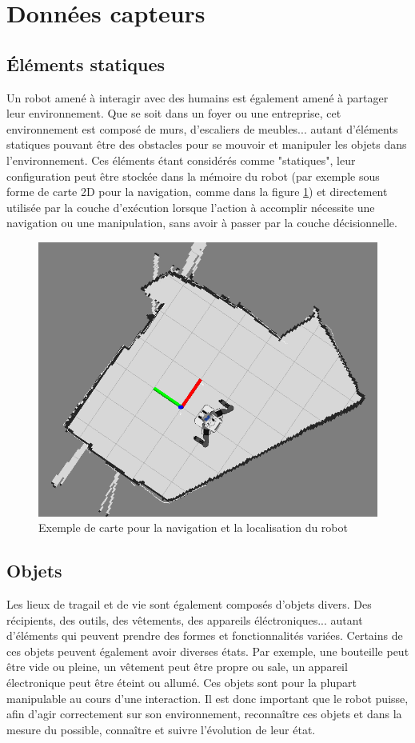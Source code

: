\documentclass[a4paper,11pt,twoside]{StyleThese}
\begin{document}
\section{Données capteurs}
\label{sec:collecte}
\subsection{Éléments statiques}
Un robot amené à interagir avec des humains est également amené à partager leur environnement. Que se soit dans un foyer ou une entreprise, cet environnement est composé de murs, d'escaliers de meubles... autant d'éléments statiques pouvant être des obstacles pour se mouvoir et manipuler les objets dans l'environnement. Ces éléments étant considérés comme "statiques", leur configuration peut être stockée dans la mémoire du robot (par exemple sous forme de carte 2D pour la navigation, comme dans la figure \ref{fig:map}) et directement utilisée par la couche d'exécution lorsque l'action à accomplir nécessite une navigation ou une manipulation, sans avoir à passer par la couche décisionnelle.

\begin{figure}[ht!]
 \centering
  \includegraphics[width=0.59\linewidth]{./img/Map2d.png} 
  \caption {Exemple de carte pour la navigation et la localisation du robot}
  \label{fig:map}
\end{figure}

\subsection{Objets}
Les lieux de tragail et de vie sont également composés d'objets divers. Des récipients, des outils, des vêtements, des appareils éléctroniques... autant d'éléments qui peuvent prendre des formes et fonctionnalités variées.
Certains de ces objets peuvent également avoir diverses états. Par exemple, une bouteille peut être vide ou pleine, un vêtement peut être propre ou sale, un appareil électronique peut être éteint ou allumé.
Ces objets sont pour la plupart manipulable au cours d'une interaction. Il est donc important que le robot puisse, afin d'agir correctement sur son environnement, reconnaître ces objets et dans la mesure du possible, connaître et suivre l'évolution de leur état.
\end{document}
